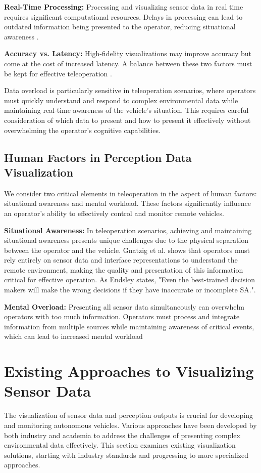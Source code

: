 \textbf{Real-Time Processing:} Processing and visualizing sensor data in real time requires significant computational resources. Delays in processing can lead to outdated information being presented to the operator, reducing situational awareness \cite{Gnatzig}.

\textbf{Accuracy vs. Latency:} High-fidelity visualizations may improve accuracy but come at the cost of increased latency. A balance between these two factors must be kept for effective teleoperation \cite{chucholowski2014teleoperated}.

Data overload is particularly sensitive in teleoperation scenarios, where operators must quickly understand and respond to complex environmental data while maintaining real-time awareness of the vehicle's situation. This requires careful consideration of which data to present and how to present it effectively without overwhelming the operator's cognitive capabilities.

\subsection{Human Factors in Perception Data Visualization}\label{subsection:humanfactors}
We consider two critical elements in teleoperation in the aspect of human factors: situational awareness and mental workload. These factors significantly influence an operator's ability to effectively control and monitor remote vehicles.

\textbf{Situational Awareness:} In teleoperation scenarios, achieving and maintaining situational awareness presents unique challenges due to the physical separation between the operator and the vehicle. Gnatzig et al. \cite{Gnatzig} shows that operators must rely entirely on sensor data and interface representations to understand the remote environment, making the quality and presentation of this information critical for effective operation.  As Endsley \cite{endsley1995toward} states, "Even the
best-trained decision makers will make the wrong decisions if they have inaccurate or incomplete SA.".

\textbf{Mental Overload:} Presenting all sensor data simultaneously can overwhelm operators with too much information.
Operators must process and integrate information from multiple sources while maintaining awareness of critical events, which can lead to increased mental workload \cite{wickens2008multiple}

\section{Existing Approaches to Visualizing Sensor Data}
The visualization of sensor data and perception outputs is crucial for developing and monitoring autonomous vehicles. Various approaches have been developed by both industry and academia to address the challenges of presenting complex environmental data effectively. This section examines existing visualization solutions, starting with industry standards and progressing to more specialized approaches.
